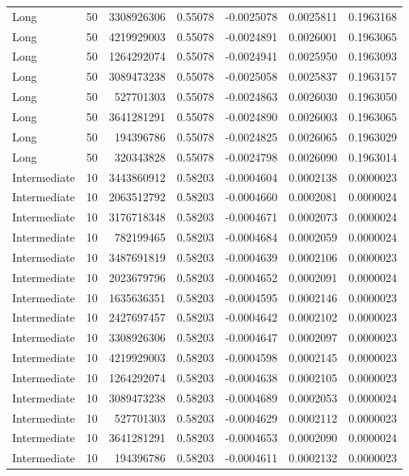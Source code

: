 \begin{longtable}{llrrrrr}
Long & 50 & 3308926306 & 0.55078 & -0.0025078 & 0.0025811 & 0.1963168 \\
Long & 50 & 4219929003 & 0.55078 & -0.0024891 & 0.0026001 & 0.1963065 \\
Long & 50 & 1264292074 & 0.55078 & -0.0024941 & 0.0025950 & 0.1963093 \\
Long & 50 & 3089473238 & 0.55078 & -0.0025058 & 0.0025837 & 0.1963157 \\
Long & 50 & 527701303 & 0.55078 & -0.0024863 & 0.0026030 & 0.1963050 \\
Long & 50 & 3641281291 & 0.55078 & -0.0024890 & 0.0026003 & 0.1963065 \\
Long & 50 & 194396786 & 0.55078 & -0.0024825 & 0.0026065 & 0.1963029 \\
Long & 50 & 320343828 & 0.55078 & -0.0024798 & 0.0026090 & 0.1963014 \\
Intermediate & 10 & 3443860912 & 0.58203 & -0.0004604 & 0.0002138 & 0.0000023 \\
Intermediate & 10 & 2063512792 & 0.58203 & -0.0004660 & 0.0002081 & 0.0000024 \\
Intermediate & 10 & 3176718348 & 0.58203 & -0.0004671 & 0.0002073 & 0.0000024 \\
Intermediate & 10 & 782199465 & 0.58203 & -0.0004684 & 0.0002059 & 0.0000024 \\
Intermediate & 10 & 3487691819 & 0.58203 & -0.0004639 & 0.0002106 & 0.0000023 \\
Intermediate & 10 & 2023679796 & 0.58203 & -0.0004652 & 0.0002091 & 0.0000024 \\
Intermediate & 10 & 1635636351 & 0.58203 & -0.0004595 & 0.0002146 & 0.0000023 \\
Intermediate & 10 & 2427697457 & 0.58203 & -0.0004642 & 0.0002102 & 0.0000023 \\
Intermediate & 10 & 3308926306 & 0.58203 & -0.0004647 & 0.0002097 & 0.0000023 \\
Intermediate & 10 & 4219929003 & 0.58203 & -0.0004598 & 0.0002145 & 0.0000023 \\
Intermediate & 10 & 1264292074 & 0.58203 & -0.0004638 & 0.0002105 & 0.0000023 \\
Intermediate & 10 & 3089473238 & 0.58203 & -0.0004689 & 0.0002053 & 0.0000024 \\
Intermediate & 10 & 527701303 & 0.58203 & -0.0004629 & 0.0002112 & 0.0000023 \\
Intermediate & 10 & 3641281291 & 0.58203 & -0.0004653 & 0.0002090 & 0.0000024 \\
Intermediate & 10 & 194396786 & 0.58203 & -0.0004611 & 0.0002132 & 0.0000023 \\

\end{longtable}
